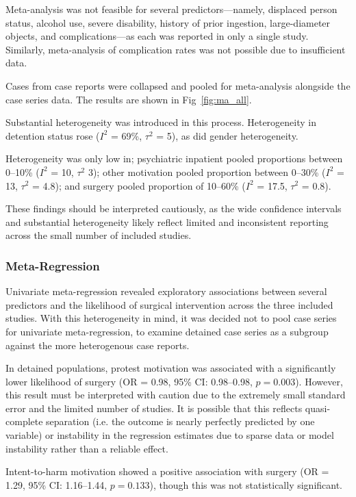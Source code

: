 Meta-analysis was not feasible for several predictors—namely, displaced person status, alcohol use, severe disability, history of prior ingestion, large-diameter objects, and complications—as each was reported in only a single study. Similarly, meta-analysis of complication rates was not possible due to insufficient data. 

Cases from case reports were collapsed and pooled for meta-analysis alongside the case series data. The results are shown in Fig~\ref{fig:ma_all}.

Substantial heterogeneity was introduced in this process. Heterogeneity in detention status rose ($I^2$ = 69\%, $\tau^2$ = 5), as did gender heterogeneity. 

Heterogeneity was only low in; psychiatric inpatient pooled proportions between 0--10\% ($I^2$ = 10, $\tau^2$ 3); other motivation pooled proportion between 0--30\% ($I^2$ = 13, $\tau^2$ = 4.8); and surgery pooled proportion of 10--60\% ($I^2$ = 17.5, $\tau^2$ = 0.8). 

These findings should be interpreted cautiously, as the wide confidence intervals and substantial heterogeneity likely reflect limited and inconsistent reporting across the small number of included studies.

\subsubsection{Meta-Regression}

Univariate meta-regression revealed exploratory associations between several predictors and the likelihood of surgical intervention across the three included studies. With this heterogeneity in mind, it was decided not to pool case series for univariate meta-regression, to examine detained case series as a subgroup against the more heterogenous case reports.

In detained populations, protest motivation was associated with a significantly lower likelihood of surgery (OR = 0.98, 95\% CI: 0.98--0.98, $p = 0.003$). However, this result must be interpreted with caution due to the extremely small standard error and the limited number of studies. It is possible that this reflects quasi-complete separation (i.e. the outcome is nearly perfectly predicted by one variable) or instability in the regression estimates due to sparse data or model instability rather than a reliable effect.

Intent-to-harm motivation showed a positive association with surgery (OR = 1.29, 95\% CI: 1.16--1.44, $p = 0.133$), though this was not statistically significant.

